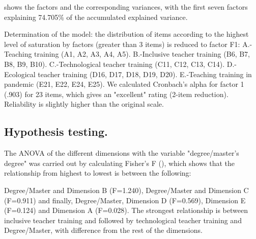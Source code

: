 \documentclass{textolivre}
\begin{document}
 shows the factors and the corresponding variances, with the first seven factors explaining 74.705\% of the accumulated explained variance.

Determination of the model: the distribution of items according to the highest level of saturation by factors (greater than 3 items) is reduced to factor F1: A.-Teaching training (A1, A2, A3, A4, A5). B.-Inclusive teacher training (B6, B7, B8, B9, B10). C.-Technological teacher training (C11, C12, C13, C14). D.-Ecological teacher training (D16, D17, D18, D19, D20). E.-Teaching training in pandemic (E21, E22, E24, E25). We calculated Cronbach's alpha for factor 1 (.903) for 23 items, which gives an "excellent" rating (2-item reduction). Reliability is slightly higher than the original scale.

\subsection{Hypothesis testing.}\label{subhypotest}
The ANOVA of the different dimensions with the variable "degree/master's degree" was carried out by calculating Fisher's F (), which shows that the relationship from highest to lowest is between the following:

Degree/Master and Dimension B (F=1.240), Degree/Master and Dimension C (F=0.911) and finally, Degree/Master, Dimension D (F=0.569), Dimension E (F=0.124) and Dimension A (F=0.028). The strongest relationship is between inclusive teacher training and followed by technological teacher training and Degree/Master, with difference from the rest of the dimensions.
\end{document}
